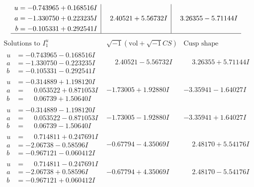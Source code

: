 \documentclass[1p]{elsarticle_modified}
\theoremstyle{definition}
\newcommand{\I}{\sqrt{-1}}
\begin{document}
$$\begin{array}{c|c|c}
\begin{aligned}
u &= -0.743965 + 0.168516 I \\
a &= -1.330750 + 0.223235 I \\
b &= -0.105331 + 0.292541 I\end{aligned}
 & \phantom{-}2.40521 + 5.56732 I & \phantom{-}3.26355 - 5.71144 I\\
 \hline 
 \end{array}$$\newpage$$\begin{array}{c|c|c}  
\text{Solutions to }I^u_{1}& \I (\text{vol} + \sqrt{-1}CS) & \text{Cusp shape}\\
 \hline 
\begin{aligned}
u &= -0.743965 - 0.168516 I \\
a &= -1.330750 - 0.223235 I \\
b &= -0.105331 - 0.292541 I\end{aligned}
 & \phantom{-}2.40521 - 5.56732 I & \phantom{-}3.26355 + 5.71144 I \\ \hline\begin{aligned}
u &= -0.314889 + 1.198120 I \\
a &= \phantom{-}0.053522 + 0.871053 I \\
b &= \phantom{-}0.06739 + 1.50640 I\end{aligned}
 & -1.73005 + 1.92880 I & -3.35941 - 1.64027 I \\ \hline\begin{aligned}
u &= -0.314889 - 1.198120 I \\
a &= \phantom{-}0.053522 - 0.871053 I \\
b &= \phantom{-}0.06739 - 1.50640 I\end{aligned}
 & -1.73005 - 1.92880 I & -3.35941 + 1.64027 I \\ \hline\begin{aligned}
u &= \phantom{-}0.714811 + 0.247691 I \\
a &= -2.06738 - 0.58596 I \\
b &= -0.967121 - 0.060412 I\end{aligned}
 & -0.67794 - 4.35069 I & \phantom{-}2.48170 + 5.54176 I \\ \hline\begin{aligned}
u &= \phantom{-}0.714811 - 0.247691 I \\
a &= -2.06738 + 0.58596 I \\
b &= -0.967121 + 0.060412 I\end{aligned}
 & -0.67794 + 4.35069 I & \phantom{-}2.48170 - 5.54176 I \\ \hline\begin{aligned}

\end{aligned}
\end{array}$$
\end{document}
